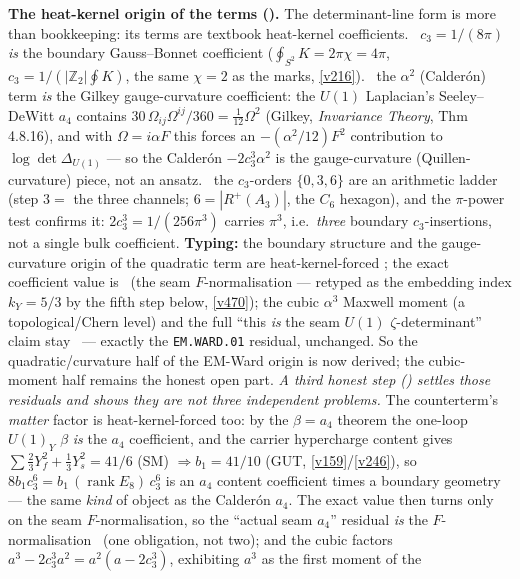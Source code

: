 \documentclass[11pt,a4paper]{article}
\newcommand{\cthree}{c_3}
\newcommand{\Z}{\mathbb{Z}}
\theoremstyle{definition}
\begin{document}
\par\smallskip
\noindent\textbf{The heat-kernel origin of the terms ().} The determinant-line
form is more than bookkeeping: its terms are textbook heat-kernel coefficients. \mE\ $\cthree=1/(8\pi)$ \emph{is}
the boundary Gauss--Bonnet coefficient ($\oint_{S^2}K=2\pi\chi=4\pi$, $\cthree=1/(|\Z_2|\oint K)$, the same
$\chi{=}2$ as the marks, \vref{v216}). \mE\ the $\alpha^2$ (Calder\'on) term \emph{is} the Gilkey gauge-curvature
coefficient: the $U(1)$ Laplacian's Seeley--DeWitt $a_4$ contains $30\,\Omega_{ij}\Omega^{ij}/360=\tfrac1{12}\Omega^2$
(Gilkey, \emph{Invariance Theory}, Thm 4.8.16), and with $\Omega=i\alpha F$ this forces an $-(\alpha^2/12)F^2$
contribution to $\log\det\Delta_{U(1)}$ --- so the Calder\'on $-2\cthree^3\alpha^2$ is the gauge-curvature
(Quillen-curvature) piece, not an ansatz. \mE\ the $\cthree$-orders $\{0,3,6\}$ are an arithmetic ladder (step $3=$
the three channels; $6=|R^+(A_3)|$, the $C_6$ hexagon), and the $\pi$-power test confirms it: $2\cthree^3=1/(256\pi^3)$
carries $\pi^3$, i.e.\ \emph{three} boundary $\cthree$-insertions, not a single bulk coefficient. \textbf{Typing:} the
boundary structure and the gauge-curvature origin of the quadratic term are heat-kernel-forced \mE; the exact
coefficient value is \mC\ (the seam $F$-normalisation --- retyped as the embedding index $k_Y{=}5/3$ by the
fifth step below, \vref{v470}); the cubic $\alpha^3$ Maxwell moment (a topological/Chern
level) and the full ``this \emph{is} the seam $U(1)$ $\zeta$-determinant'' claim stay \mO\ --- exactly the
\texttt{EM.WARD.01} residual, unchanged. So the quadratic/curvature half of the EM-Ward origin is now derived; the
cubic-moment half remains the honest open part.
\emph{A third honest step () settles those residuals and shows they are
not three independent problems.} The counterterm's \emph{matter} factor is heat-kernel-forced too: by the
$\beta=a_4$ theorem the one-loop $U(1)_Y$ $\beta$ \emph{is} the $a_4$ coefficient, and the carrier hypercharge
content gives $\sum\tfrac23 Y_f^2+\tfrac13 Y_s^2=41/6$ (SM) $\Rightarrow b_1=41/10$ (GUT, \vref{v159}/\vref{v246}),
so $8b_1\cthree^6=b_1\,(\operatorname{rank}E_8)\,\cthree^6$ is an $a_4$ content coefficient times a boundary
geometry --- the same \emph{kind} of object as the Calder\'on $a_4$. The exact value then turns only on the seam
$F$-normalisation, so the ``actual seam $a_4$'' residual \emph{is} the $F$-normalisation \mC\ (one obligation, not
two); and the cubic factors $a^3-2\cthree^3 a^2=a^2(a-2\cthree^3)$, exhibiting $a^3$ as the first moment of the
\end{document}
